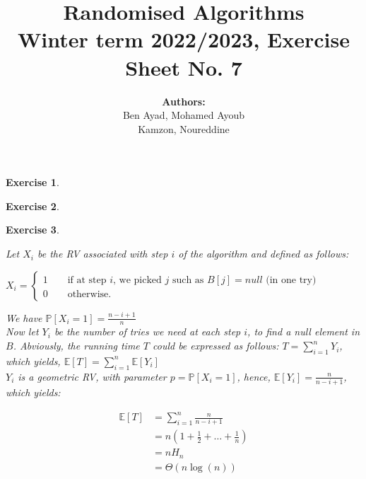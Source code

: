 \documentclass{article}
\title{Randomised Algorithms \\
Winter term 2022/2023, Exercise Sheet No. 7}
\author{
    \textbf{Authors:} \\
    Ben Ayad, Mohamed Ayoub \\
    Kamzon, Noureddine
}
\newtheorem{exo}{Exercise}
\def\P{\mathbb{P}}
\def\E{\mathbb{E}}
\begin{document}
\maketitle

\begin{exo}{\ \\}

\end{exo}

\begin{exo}{\ \\}

\end{exo}

\begin{exo}{\ \\}

Let $X_i$ be the RV associated with step $i$ of the algorithm and defined as follows:

$X_i = 
\begin{cases}
    1 \quad \quad \text{if at step $i$, we picked $j$ such as $B[j] = null$ (in one try)} \\
    0 \quad \quad \text{otherwise.} 
\end{cases}
$

 We have $\P[X_i = 1] = \frac{n-i+1}{n}$ \\




Now let $Y_i$ be the number of tries we need at each step $i$, to find a null element in $B$. Abviously, the running time $T$ could be expressed as follows: $T = \sum^{n}_{i=1} Y_i$, which yields, $\E[T] = \sum^{n}_{i=1} \E[Y_i]$ \\

$Y_i$ is a geometric RV, with parameter $p = \P[X_i = 1]$, hence, $\E[Y_i] = \frac{n}{n-i+1} $, which yields:

\begin{align*}
    \E[T] 
    &= \sum^{n}_{i=1} \frac{n}{n-i+1} \\
    &= n(1+ \frac{1}{2} + \dots + \frac{1}{n} ) \\
    &= n H_n \\
    &= \Theta(n\log(n))
\end{align*}






\end{exo}
\end{document}
